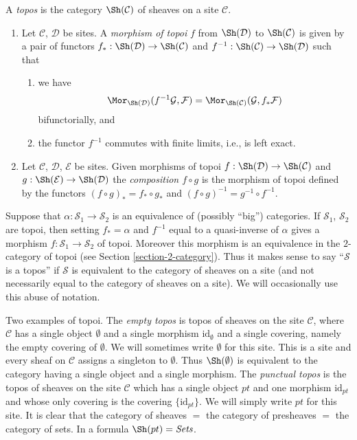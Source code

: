 \begin{definition}[Topoi]
\label{definition-topos}
A {\it topos} is the category $\Sh(\mathcal{C})$ of sheaves
on a site $\mathcal{C}$.
\begin{enumerate}
\item Let $\mathcal{C}$, $\mathcal{D}$ be sites.
A {\it morphism of topoi} $f$ from $\Sh(\mathcal{D})$
to $\Sh(\mathcal{C})$ is given by a pair of functors
$f_* : \Sh(\mathcal{D}) \to \Sh(\mathcal{C})$
and
$f^{-1} : \Sh(\mathcal{C}) \to \Sh(\mathcal{D})$
such that
\begin{enumerate}
\item we have
$$
\Mor_{\Sh(\mathcal{D})}(f^{-1}\mathcal{G}, \mathcal{F})
=
\Mor_{\Sh(\mathcal{C})}(\mathcal{G}, f_*\mathcal{F})
$$
bifunctorially, and
\item the functor $f^{-1}$ commutes with finite limits, i.e.,
is left exact.
\end{enumerate}
\item Let $\mathcal{C}$, $\mathcal{D}$, $\mathcal{E}$ be sites.
Given morphisms of topoi
$f :\Sh(\mathcal{D}) \to \Sh(\mathcal{C})$ and
$g :\Sh(\mathcal{E}) \to \Sh(\mathcal{D})$ the
{\it composition $f\circ g$} is the morphism of topoi defined
by the functors
$(f \circ g)_* = f_* \circ g_*$ and
$(f \circ g)^{-1} = g^{-1} \circ f^{-1}$.
\end{enumerate}
\end{definition}

\noindent
Suppose that $\alpha : \mathcal{S}_1 \to \mathcal{S}_2$ is an equivalence of
(possibly ``big'') categories. If $\mathcal{S}_1$, $\mathcal{S}_2$
are topoi, then setting $f_* = \alpha$ and $f^{-1}$ equal to a quasi-inverse
of $\alpha$ gives a morphism $f : \mathcal{S}_1 \to \mathcal{S}_2$ of topoi.
Moreover this morphism is an equivalence in the $2$-category of topoi (see
Section \ref{section-2-category}).
Thus it makes sense to say ``$\mathcal{S}$ is a topos'' if $\mathcal{S}$
is equivalent to the category of sheaves on a site (and not necessarily
equal to the category of sheaves on a site). We will occasionally
use this abuse of notation.

\medskip\noindent
Two examples of topoi. The {\it empty topos} is topos
of sheaves on the site $\mathcal{C}$, where $\mathcal{C}$ has
a single object $\emptyset$ and a single morphism $\text{id}_\emptyset$
and a single covering, namely the empty covering of $\emptyset$.
We will sometimes write $\emptyset$ for this site.
This is a site and every sheaf on $\mathcal{C}$ assigns a singleton to
$\emptyset$. Thus $\Sh(\emptyset)$ is equivalent to the category
having a single object and a single morphism.
The {\it punctual topos} is the topos of sheaves on the site
$\mathcal{C}$ which has a single object $pt$ and one morphism
$\text{id}_{pt}$ and whose only covering is the covering
$\{\text{id}_{pt}\}$. We will simply write $pt$ for this site.
It is clear that the category of sheaves $ = $ the category of
presheaves $ = $ the category of sets.
In a formula $\Sh(pt) = \textit{Sets}$.

